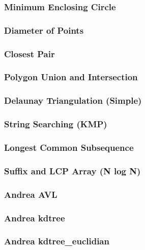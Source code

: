 \subsubsection*{Minimum Enclosing Circle}

\subsubsection*{Diameter of Points}

\subsubsection*{Closest Pair}

\subsubsection*{Polygon Union and Intersection}

\subsubsection*{Delaunay Triangulation (Simple)}

\subsubsection*{String Searching (KMP)}

\subsubsection*{Longest Common Subsequence}

\subsubsection*{Suffix and LCP Array (N log N)}

\subsubsection*{Andrea AVL}

\subsubsection*{Andrea kdtree}

\subsubsection*{Andrea kdtree\_euclidian}


